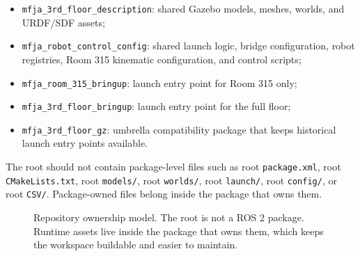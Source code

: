 \documentclass[12pt,a4paper]{report}
\begin{document}
\begin{itemize}
\item \texttt{mfja\_3rd\_floor\_description}: shared Gazebo models, meshes,
worlds, and URDF/SDF assets;
\item \texttt{mfja\_robot\_control\_config}: shared launch logic, bridge
configuration, robot registries, Room 315 kinematic configuration, and control
scripts;
\item \texttt{mfja\_room\_315\_bringup}: launch entry point for Room 315 only;
\item \texttt{mfja\_3rd\_floor\_bringup}: launch entry point for the full
floor;
\item \texttt{mfja\_3rd\_floor\_gz}: umbrella compatibility package that keeps
historical launch entry points available.
\end{itemize}

The root should not contain package-level files such as root
\texttt{package.xml}, root \texttt{CMakeLists.txt}, root \texttt{models/},
root \texttt{worlds/}, root \texttt{launch/}, root \texttt{config/}, or root
\texttt{CSV/}. Package-owned files belong inside the package that owns them.

\begin{figure}[p]
\centering
{}
\caption{Repository ownership model. The root is not a ROS 2 package. Runtime
assets live inside the package that owns them, which keeps the workspace
buildable and easier to maintain.}
\label{fig:repo-architecture-flow}
\end{figure}
\end{document}
